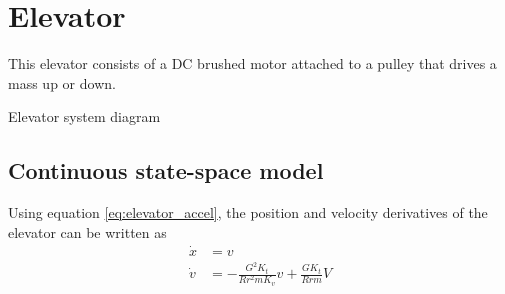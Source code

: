 \section{Elevator}
\label{sec:ss_model_elevator}

This elevator consists of a DC brushed motor attached to a pulley that drives a
mass up or down.
\begin{bookfigure}
  
  \caption{Elevator system diagram}
\end{bookfigure}

\subsection{Continuous state-space model}

Using equation \eqref{eq:elevator_accel}, the position and velocity derivatives
of the elevator can be written as
\begin{align}
  \dot{x} &= v \\
  \dot{v} &= -\frac{G^2 K_t}{Rr^2 m K_v} v + \frac{GK_t}{Rrm} V
\end{align}

